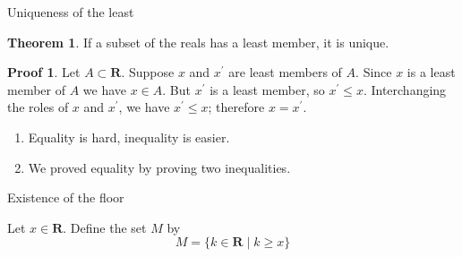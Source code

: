 \documentclass[fleqn]{beamer}
\newcommand{\reals}{\mathbf{R}}
\theoremstyle{definition}
\newtheorem{myth}{Theorem}
\newtheorem{myproof}{Proof}
\newenvironment{numberlist}
   {\begin{enumerate}[(1)]
       \addtolength{\itemsep}{-0.5\itemsep}}
     {\end{enumerate}}
\begin{document}
\begin{frame}{Uniqueness of the least}
\begin{myth} If a subset of the reals has a least member, it is unique.

\end{myth}

\begin{myproof} Let \(A \subset \reals\). Suppose \(x\) and  \(x^\prime\) are least members of \(A\). Since \(x\) is a least member of \(A\) we have
  \(x \in A\). But \(x^\prime\) is a least member, so \(x^\prime \leq x\).
Interchanging the roles of \(x\) and \(x^\prime\), we have \(x^\prime \leq x\); therefore \(x = x^\prime\).

\end{myproof}

\begin{numberlist}
\item Equality is hard, inequality is easier.
\item We proved equality by proving two inequalities.
\end{numberlist}
\end{frame}

\begin{frame}{Existence of the floor}

Let \(x \in \reals\). Define the set \(M\) by
\[
     M = \{k \in \reals \mid k \geq x \}
\]

\end{frame}
\end{document}
